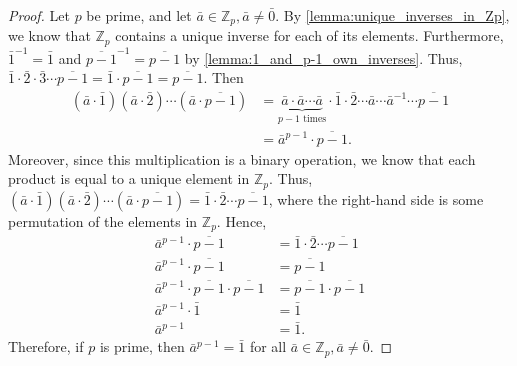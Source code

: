 \documentclass[12pt, titlepage]{amsart}
\newcommand\Z{{\mathbb Z}}
\newtheorem{cor}{Corollary}[subsection]
\theoremstyle{definition}
\newtheorem{definition}{Definition}[subsection]
\begin{document}
	\begin{proof}
		Let $p$ be prime, and let $\bar{a} \in \Z_p, \bar{a} \neq \bar{0}$.
		By \cref{lemma:unique_inverses_in_Zp}, we know that $\Z_p$ contains a unique inverse for each of its elements. 
		Furthermore, $\bar{1}^{-1} = \bar{1}$ and $\overline{p-1}^{-1} = \overline{p-1}$ by \cref{lemma:1_and_p-1_own_inverses}.
		Thus, $\bar{1} \cdot \bar{2} \cdot \bar{3} \cdots \overline{p-1} = \bar{1} \cdot \overline{p-1} = \overline{p-1}$. 
		Then 
		\begin{align*}
			(\bar{a} \cdot \bar{1})(\bar{a} \cdot \bar{2}) \cdots (\bar{a} \cdot \overline{p-1})
			&= \underbrace{\bar{a} \cdot \bar{a} \cdots \bar{a}}_{p-1 \text{ times}} \cdot \bar{1} \cdot \bar{2} \cdots \bar{a} \cdots \bar{a}^{-1} \cdots \overline{p-1} \\
			&= \bar{a}^{p-1} \cdot \overline{p-1}.
		\end{align*}
		Moreover, since this multiplication is a binary operation, we know that each product is equal to a unique element in $\Z_p$.
		Thus, $(\bar{a} \cdot \bar{1})(\bar{a} \cdot \bar{2}) \cdots (\bar{a} \cdot \overline{p-1}) = \bar{1} \cdot \bar{2} \cdots \overline{p-1}$, where the right-hand side is some permutation of the elements in $\Z_p$.
		Hence,
		\begin{align*}
			\bar{a}^{p-1} \cdot \overline{p-1} 
			&= \bar{1} \cdot \bar{2} \cdots \overline{p-1} \\
			\bar{a}^{p-1} \cdot \overline{p-1}
			&= \overline{p-1} \\
			\bar{a}^{p-1}\cdot \overline{p-1} \cdot \overline{p-1}
			&= \overline{p-1}	\cdot \overline{p-1} \\
			\bar{a}^{p-1}\cdot \bar{1} 
			&= \bar{1}  \\
			\bar{a}^{p-1}
			&= \bar{1}.
		\end{align*}
		Therefore, if $p$ is prime, then $\bar{a}^{p-1} = \bar{1}$ for all $\bar{a} \in \Z_p, \bar{a} \neq \bar{0}$.
	\end{proof}
	
%	
%	
	
\end{document}
